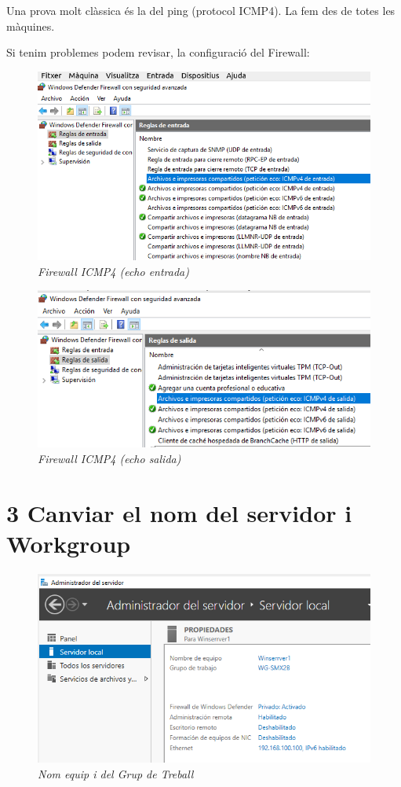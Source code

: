 \documentclass[
  a4paper,
]{article}
\begin{document}
Una prova molt clàssica és la del ping (protocol ICMP4). La fem des de
totes les màquines.

Si tenim problemes podem revisar, la configuració del Firewall:

\begin{figure}
\centering
\includegraphics{png/ADDS/FirewallICMP4Entrada.png}
\caption{\emph{Firewall ICMP4 (echo entrada)}}
\end{figure}

\begin{figure}
\centering
\includegraphics{png/ADDS/FirewallICMP4Salida.png}
\caption{\emph{Firewall ICMP4 (echo salida)}}
\end{figure}

\section{3 Canviar el nom del servidor i
Workgroup}\label{canviar-el-nom-del-servidor-i-workgroup}

\begin{figure}
\centering
\includegraphics{png/ADDS/WorkgroupNomEquip.png}
\caption{\emph{Nom equip i del Grup de Treball}}
\end{figure}
\end{document}
